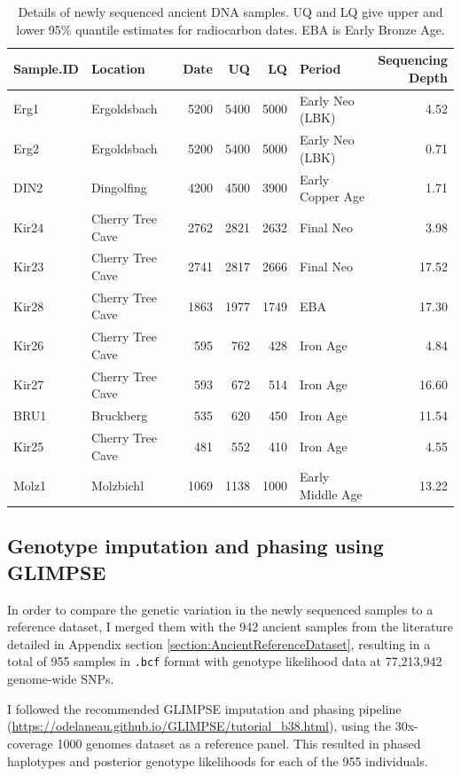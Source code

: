 \begin{table}
\centering
\begin{tabular}[t]{llrrrlr}
\toprule
Sample.ID & Location & Date & UQ & LQ & Period & \thead{Sequencing\\ Depth}\\
\midrule
Erg1 & Ergoldsbach & 5200 & 5400 & 5000 & Early Neo (LBK) & 4.52\\
Erg2 & Ergoldsbach & 5200 & 5400 & 5000 & Early Neo (LBK) & 0.71\\
DIN2 & Dingolfing & 4200 & 4500 & 3900 & Early Copper Age & 1.71\\
Kir24 & Cherry Tree Cave & 2762 & 2821 & 2632 & Final Neo & 3.98\\
Kir23 & Cherry Tree Cave & 2741 & 2817 & 2666 & Final Neo & 17.52\\
Kir28 & Cherry Tree Cave & 1863 & 1977 & 1749 & EBA & 17.30\\
Kir26 & Cherry Tree Cave & 595 & 762 & 428 & Iron Age & 4.84\\
Kir27 & Cherry Tree Cave & 593 & 672 & 514 & Iron Age & 16.60\\
BRU1 & Bruckberg & 535 & 620 & 450 & Iron Age & 11.54\\
Kir25 & Cherry Tree Cave & 481 & 552 & 410 & Iron Age & 4.55\\
Molz1 & Molzbichl & 1069 & 1138 & 1000 & Early Middle Age & 13.22\\
\bottomrule
\end{tabular}
\caption{Details of newly sequenced ancient DNA samples. UQ and LQ give upper and lower 95\% quantile estimates for radiocarbon dates. EBA is Early Bronze Age.}
\label{tab:BavariaSampleInfo}
\end{table}

\subsection{Genotype imputation and phasing using GLIMPSE}
\label{sssec:imputationphasingGLIMPSE}

In order to compare the genetic variation in the newly sequenced samples to a reference dataset, I merged them with the 942 ancient samples from the literature detailed in Appendix section \ref{section:AncientReferenceDataset}, resulting in a total of 955 samples in \texttt{.bcf} format with genotype likelihood data at 77,213,942 genome-wide SNPs. 

I followed the recommended GLIMPSE \cite{rubinacci2021efficient} imputation and phasing pipeline (\url{https://odelaneau.github.io/GLIMPSE/tutorial_b38.html}), using the 30x-coverage 1000 genomes dataset \cite{byrska2021high} as a reference panel. This resulted in phased haplotypes and posterior genotype likelihoods for each of the 955 individuals. 

